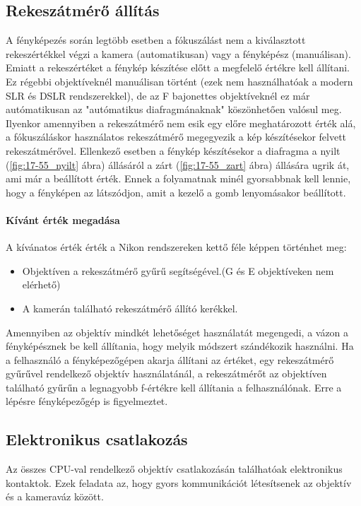 \subsection{Rekeszátmérő állítás}
A fényképezés során legtöbb esetben a fókuszálást nem a kiválasztott rekeszértékkel végzi a kamera (automatikusan) vagy a fényképész (manuálisan).
Emiatt a rekeszértéket a fénykép készítése előtt a megfelelő értékre kell állítani.
Ez régebbi objektíveknél manuálisan történt (ezek nem használhatóak a modern SLR és DSLR rendszerekkel), de az F bajonettes objektíveknél ez már autómatikusan az "autómatikus diafragmánaknak" köszönhetően valósul meg.
Ilyenkor amennyiben a rekeszátmérő nem esik egy előre meghatározott érték alá, a fókuszáláskor használatos rekeszátmérő megegyezik a kép készítésekor felvett rekeszátmérővel. Ellenkező esetben a fénykép készítésekor a diafragma a nyilt (\ref{fig:17-55_nyilt} ábra) állásáról a zárt (\ref{fig:17-55_zart} ábra) állására ugrik át, ami már a beállított érték.
Ennek a folyamatnak minél gyorsabbnak kell lennie, hogy a fényképen az látszódjon, amit a kezelő a gomb lenyomásakor beállított. \cite{Practical_design_considerations_for_modern_photographic_optics}
\paragraph{Kívánt érték megadása}
A kívánatos érték érték a Nikon rendszereken kettő féle képpen történhet meg:
\begin{itemize}
    \item Objektíven a rekeszátmérő gyűrű segítségével.(G és E objektíveken nem elérhető)
    \item A kamerán található rekeszátmérő állító kerékkel.
\end{itemize}
Amennyiben az objektív mindkét lehetőséget használatát megengedi, a vázon a fényképésznek be kell állítania, hogy melyik módszert szándékozik használni.
Ha a felhasználó a fényképezőgépen akarja állítani az értéket, egy rekeszátmérő gyűrűvel rendelkező objektív használatánál, a rekeszátmérőt az objektíven található gyűrűn a legnagyobb f-értékre kell állítania a felhasználónak.
Erre a lépésre fényképezőgép is figyelmeztet.\cite{Nikon_D6_referencia_használati_utasítás}

\subsection{Elektronikus csatlakozás}
Az összes CPU-val rendelkező objektív csatlakozásán találhatóak elektronikus kontaktok.\cite{Nikon_CPU}
Ezek feladata az, hogy gyors kommunikációt létesítsenek az objektív és a kameraváz között.

